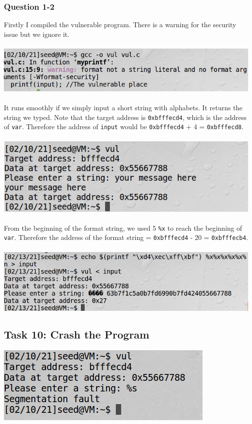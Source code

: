 \documentclass[a4paper]{article}
\begin{document}
\subsubsection{Question 1-2}
Firstly I compiled the vulnerable program. There is a warning for the security issue but we ignore it.\\\\
\includegraphics[scale=0.7]{3/1.png}\\\\
It runs smoothly if we simply input a short string with alphabets. It returns the string we typed. Note that the target address is \verb+0xbfffecd4+, which is the address of \verb+var+. Therefore the address of \verb+input+ would be \verb+0xbfffecd4+ + 4 = \verb+0xbfffecd8+.\\\\
\includegraphics[scale=0.7]{3/2.png}\\\\
From the beginning of the format string, we used 5 \verb+%x+ to reach the beginning of \verb+var+. Therefore the address of the format string = \verb+0xbfffecd4+ - 20 = \verb+0xbfffecb4+.\\\\
\includegraphics[scale=0.7]{3/3.png}
\subsection{Task 10: Crash the Program}
\includegraphics[scale=0.7]{3/7.png}
\end{document}
